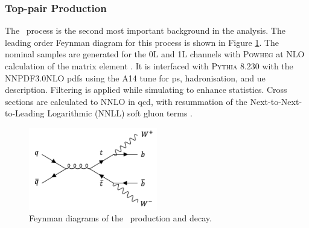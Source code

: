 \subsubsection{Top-pair Production}\label{subsec-vh-top-samples}
The \ttb\ process is the second most important background in the analysis. The leading order Feynman diagram for this process is shown in Figure \ref{fig:feynttb}. The nominal samples are generated for the 0L and 1L channels with \textsc{Powheg} at NLO calculation of the matrix element \cite{StefanoFrixione_2007, PaoloNason_2004}. It is interfaced with \textsc{Pythia} 8.230 with the NNPDF3.0NLO \glspl{pdf} using the A14 tune for \gls{ps}, hadronisation, and \gls{ue} description. Filtering is applied while simulating to enhance statistics. Cross sections are calculated to NNLO in \gls{qcd}, with resummation of the Next-to-Next-to-Leading Logarithmic (NNLL) soft gluon terms \cite{CZAKON20142930}.

\begin{figure}[h!]
  \center
  \includegraphics[width=0.5\textwidth]{Images/VH/Feynman/ttb.png}
  \caption{Feynman diagrams of the \ttb\ production and decay.} 
  \label{fig:feynttb}
\end{figure}

